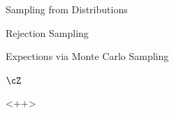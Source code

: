 \documentclass{article}
\begin{document}
\begin{ssection}{Sampling from Distributions}
\begin{ssubsection}{Rejection Sampling}
	\end{ssubsection}

\end{ssection}

\begin{ssection}{Expections via Monte Carlo Sampling}

	$\cZ$

\end{ssection}<++>
\end{document}
